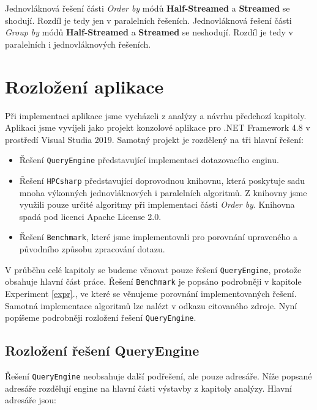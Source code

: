 Jednovláknová řešení části \textit{Order by} módů \textbf{Half-Streamed} a \textbf{Streamed} se shodují.
Rozdíl je tedy jen v paralelních řešeních.
Jednovláknová řešení části \textit{Group by} módů \textbf{Half-Streamed} a \textbf{Streamed} se neshodují.
Rozdíl je tedy v paralelních i jednovláknových řešeních.

\section{Rozložení aplikace}

Při implementaci aplikace jsme vycházeli z analýzy a návrhu předchozí kapitoly.
Aplikaci jsme vyvíjeli jako projekt konzolové aplikace pro .NET Framework 4.8 v prostředí Visual Studia 2019.
Samotný projekt je rozdělený na tři hlavní řešení:

\begin{itemize}

\item Řešení \texttt{QueryEngine} představující implementaci dotazovacího enginu.
\item Řešení \texttt{HPCsharp} \citep{hpcsharp} představující doprovodnou knihovnu, která poskytuje sadu mnoha výkonných jednovláknových i paralelních algoritmů.
Z knihovny jsme využili pouze určité algoritmy při implementaci části \textit{Order by}.
Knihovna spadá pod licenci Apache License 2.0.
\item Řešení \texttt{Benchmark}, které jsme implementovali pro porovnání upraveného a původního způsobu zpracování dotazu. 

\end{itemize}

V průběhu celé kapitoly se budeme věnovat pouze řešení \texttt{QueryEngine}, protože obsahuje hlavní část práce.
Řešení \texttt{Benchmark} je popsáno podrobněji v kapitole Experiment \ref{expr}., ve které se věnujeme porovnání implementovaných řešení.
Samotná implementace algoritmů lze nalézt v odkazu citovaného zdroje. 
Nyní popíšeme podrobněji rozložení řešení \texttt{QueryEngine}.

\subsection{Rozložení řešení QueryEngine}

Řešení \texttt{QueryEngine} neobsahuje další podřešení, ale pouze adresáře.
Níže popsané adresáře rozdělují engine na hlavní části výstavby z kapitoly analýzy.
Hlavní adresáře jsou:

